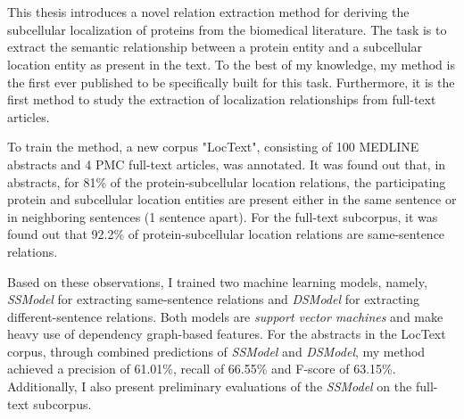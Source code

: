 \chapter{\abstractname}


This thesis introduces a novel relation extraction method for deriving the subcellular localization of proteins from the biomedical literature. The task is to extract the semantic relationship between a protein entity and a subcellular location entity as present in the text. To the best of my knowledge, my method is the first ever published to be specifically built for this task. Furthermore, it is the first method to study the extraction of localization relationships from full-text articles.

To train the method, a new corpus "LocText", consisting of 100 MEDLINE abstracts and 4 PMC full-text articles, was annotated. It was found out that, in abstracts, for 81\% of the protein-subcellular location relations, the participating protein and  subcellular location entities are present either in the same sentence or in neighboring sentences (1 sentence apart). For the full-text subcorpus, it was found out that 92.2\% of protein-subcellular location relations are same-sentence relations.

Based on these observations, I trained two machine learning models, namely, \textit{SSModel} for extracting same-sentence relations and \textit{DSModel} for extracting different-sentence relations. Both models are \textit{support vector machines} and make heavy use of dependency graph-based features. For the abstracts in the LocText corpus, through combined predictions of \textit{SSModel} and \textit{DSModel}, my method achieved a precision of 61.01\%, recall of 66.55\% and F-score of 63.15\%. Additionally, I also present preliminary evaluations of the \textit{SSModel} on the full-text subcorpus.